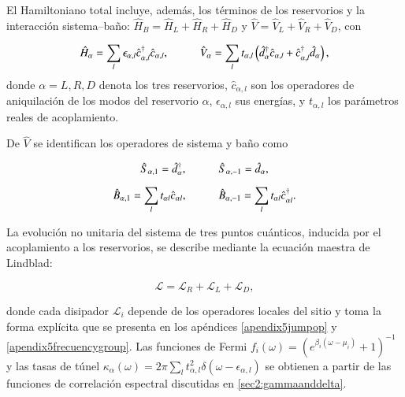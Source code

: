 El Hamiltoniano total incluye, además, los términos de los reservorios y la interacción sistema–baño: $\hat{H}_{B} = \hat{H}_{L}+\hat{H}_{R}+\hat{H}_{D}$ y $\hat{V} = \hat{V}_{L}+\hat{V}_{R}+\hat{V}_{D}$, con 

\begin{equation*}
    \hat{H}_{\alpha} = \sum_{l} \epsilon_{\alpha, l} \hat{c}^{\dagger}_{\alpha, l}\hat{c}_{\alpha, l}, \hspace{10mm} 
    \hat{V}_{\alpha} = \sum_{l} t_{\alpha, l} \left( \hat{d}^{\dagger}_{\alpha} \hat{c}_{\alpha, l} + \hat{c}^{\dagger}_{\alpha, l} \hat{d}_{\alpha} \right),
\end{equation*}
donde $\alpha = L,R,D$ denota los tres reservorios, $\hat{c}_{\alpha,l}$ son los operadores de aniquilación de los modos del reservorio $\alpha$, $\epsilon_{\alpha, l}$ sus energías, y $t_{\alpha, l}$ los parámetros reales de acoplamiento. 

De $\hat{V}$ se identifican los operadores de sistema y baño como 

\begin{equation*}
    \hat{S}_{\alpha,1} = \hat{d}^{\dagger}_{\alpha}, \hspace{10mm} \hat{S}_{\alpha,-1} = \hat{d}_{\alpha},
\end{equation*}

\begin{equation*}
    \hat{B}_{\alpha,1} = \sum_{l}t_{\alpha l} \hat{c}_{\alpha l}, \hspace{10mm} \hat{B}_{\alpha,-1} = \sum_{l}t_{\alpha l} \hat{c}^{\dagger}_{\alpha l}.
\end{equation*}

La evolución no unitaria del sistema de tres puntos cuánticos, inducida por el acoplamiento a los reservorios, se describe mediante la ecuación maestra de Lindblad:  

\begin{equation}
    \mathcal{L} = \mathcal{L}_{R} + \mathcal{L}_{L} + \mathcal{L}_{D},
    \label{Lindbladsec5}
\end{equation}

donde cada disipador $\mathcal{L}_{i}$ depende de los operadores locales del sitio y toma la forma explícita que se presenta en los apéndices \ref{apendix5jumpop} y \ref{apendix5frecuencygroup}. Las funciones de Fermi $f_{i}(\omega) = \left( e^{\beta_{i}(\omega - \mu_{i})}+1 \right)^{-1}$ y las tasas de túnel $\kappa_{\alpha}(\omega)= 2\pi \sum_{l}t^{2}_{\alpha,l}\delta(\omega-\epsilon_{\alpha,l})$ se obtienen a partir de las funciones de correlación espectral discutidas en \ref{sec2:gammaanddelta}.  

